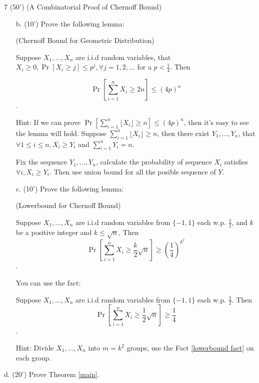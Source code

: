 \begin{question}{7 (50') (A Combinatorial Proof of Chernoff Bound)}
\begin{itemize}
            \item[b. (10')] Prove the following lemma: 
    
            \begin{lemma}(Chernoff Bound for Geometric Distribution) 
            \label{lemma: geometric}
            
      Suppose $X_1, \dots, X_n$ are i.i.d random variables, that $X_i \ge 0, \Pr[X_i \ge j] \le p^ j, \forall j = 1, 2, \dots$ for a $p < \frac 14$. Then 
      
      $$\Pr[\sum_{i =1 } ^ n X_i \ge 2n] \le (4p) ^ {n}$$.
            \end{lemma}
    
            Hint: If we can prove $\Pr[\sum_{i = 1} ^ n \lfloor X_i \rfloor \ge n] \le (4p) ^ n$, then it's easy to see the lemma will hold. Suppose $\sum_{i = 1} ^ n  \lfloor X_i \rfloor  \ge n$, then there exist $Y_1, \dots, Y_n$, that $\forall 1\le i\le n, X_i \ge Y_i$ and $\sum_{i = 1} ^ n Y_i = n$. 
    
            Fix the sequence $Y_1, \dots, Y_n$, calculate the probability of sequence $X_i$ satisfies $\forall i, X_i \ge Y_i$. Then use union bound for all the posible sequence of $Y$.
    
    
            \item[c. (10')]  Prove the following lemma: 
            \begin{lemma} (Lowerbound for Chernoff Bound)
        
        Suppose $X_1, \dots, X_n$ are i.i.d random variables from $\{-1, 1\}$ each w.p. $\frac 12$, and $k$ be a positive integer and $k\le \sqrt n$, Then 
        $$\Pr[\sum_{i = 1} ^ n X_i \ge \frac k2\sqrt{n}] \ge \left(\frac 14\right) ^ {k^ 2}$$.
    
    \end{lemma}
    
    You can use the fact: 
    
    \begin{fact}\label{lowerbound fact}
            Suppose $X_1, \dots, X_n$ are i.i.d random variables from $\{-1, 1\}$ each w.p. $\frac 12$. Then 
        $$\Pr[\sum_{i = 1} ^ n X_i \ge \frac 12\sqrt{n}] \ge \frac 14$$.
    
    \end{fact}
    
    Hint: Divide $X_1, \dots, X_n$ into $m = k^ 2$ groups, use the Fact \ref{lowerbound fact} on each group. 
        \end{itemize}
    
        \item [d. (20')] Prove Theorem \ref{main}. 
        \end{question}  


